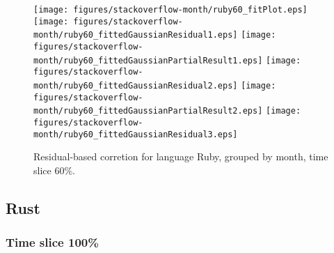 \begin{figure}[hb]
\centering
{}
{\texttt{[image: figures/stackoverflow-month/ruby60\_fitPlot.eps]}}
{\texttt{[image: figures/stackoverflow-month/ruby60\_fittedGaussianResidual1.eps]}}
{\texttt{[image: figures/stackoverflow-month/ruby60\_fittedGaussianPartialResult1.eps]}}
{\texttt{[image: figures/stackoverflow-month/ruby60\_fittedGaussianResidual2.eps]}}
{\texttt{[image: figures/stackoverflow-month/ruby60\_fittedGaussianPartialResult2.eps]}}
{\texttt{[image: figures/stackoverflow-month/ruby60\_fittedGaussianResidual3.eps]}}
\caption{Residual-based corretion for language Ruby, grouped by month, time slice 60\%.}
\end{figure}


\clearpage 
\newpage 


\subsection{Rust}

\FloatBarrier

\subsubsection{Time slice 100\%}

